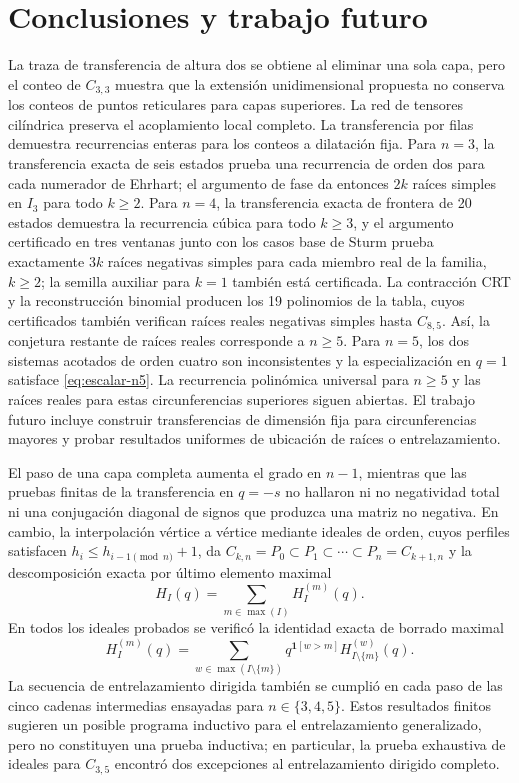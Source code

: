 \documentclass[11pt,a4paper]{article}
\theoremstyle{definition}
\begin{document}
\section{Conclusiones y trabajo futuro}

La traza de transferencia de altura dos se obtiene al eliminar una sola capa, pero el conteo de $C_{3,3}$ muestra que la extensión unidimensional propuesta no conserva los conteos de puntos reticulares para capas superiores. La red de tensores cilíndrica preserva el acoplamiento local completo. La transferencia por filas demuestra recurrencias enteras para los conteos a dilatación fija. Para $n=3$, la transferencia exacta de seis estados prueba una recurrencia de orden dos para cada numerador de Ehrhart; el argumento de fase da entonces $2k$ raíces simples en $I_3$ para todo $k\ge2$. Para $n=4$, la transferencia exacta de frontera de 20 estados demuestra la recurrencia cúbica para todo $k\ge3$, y el argumento certificado en tres ventanas junto con los casos base de Sturm prueba exactamente $3k$ raíces negativas simples para cada miembro real de la familia, $k\ge2$; la semilla auxiliar para $k=1$ también está certificada. La contracción CRT y la reconstrucción binomial producen los 19 polinomios de la tabla, cuyos certificados también verifican raíces reales negativas simples hasta $C_{8,5}$. Así, la conjetura restante de raíces reales corresponde a $n\ge5$. Para $n=5$, los dos sistemas acotados de orden cuatro son inconsistentes y la especialización en $q=1$ satisface \eqref{eq:escalar-n5}. La recurrencia polinómica universal para $n\ge5$ y las raíces reales para estas circunferencias superiores siguen abiertas. El trabajo futuro incluye construir transferencias de dimensión fija para circunferencias mayores y probar resultados uniformes de ubicación de raíces o entrelazamiento.

El paso de una capa completa aumenta el grado en $n-1$, mientras que las pruebas finitas de la transferencia en $q=-s$ no hallaron ni no negatividad total ni una conjugación diagonal de signos que produzca una matriz no negativa. En cambio, la interpolación vértice a vértice mediante ideales de orden, cuyos perfiles satisfacen $h_i\le h_{i-1\pmod n}+1$, da $C_{k,n}=P_0\subset P_1\subset\cdots\subset P_n=C_{k+1,n}$ y la descomposición exacta por último elemento maximal
\[
H_I(q)=\sum_{m\in\max(I)}H_I^{(m)}(q).
\]
En todos los ideales probados se verificó la identidad exacta de borrado maximal
\[
H_I^{(m)}(q)=\sum_{w\in\max(I\setminus\{m\})}
q^{\mathbf{1}[w>m]}H_{I\setminus\{m\}}^{(w)}(q).
\]
La secuencia de entrelazamiento dirigida también se cumplió en cada paso de las cinco cadenas intermedias ensayadas para $n\in\{3,4,5\}$. Estos resultados finitos sugieren un posible programa inductivo para el entrelazamiento generalizado, pero no constituyen una prueba inductiva; en particular, la prueba exhaustiva de ideales para $C_{3,5}$ encontró dos excepciones al entrelazamiento dirigido completo.
\end{document}

